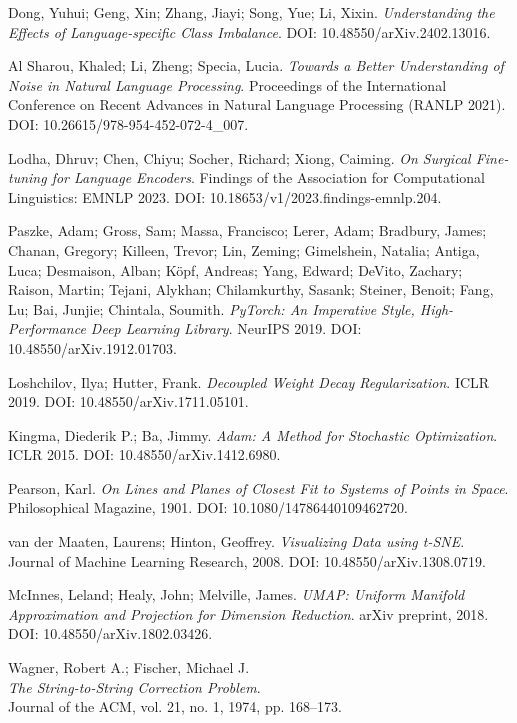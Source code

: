 \documentclass[12pt]{article}
\begin{document}
\begin{thebibliography}{9}
Dong, Yuhui; Geng, Xin; Zhang, Jiayi; Song, Yue; Li, Xixin.
\textit{Understanding the Effects of Language-specific Class Imbalance}.
DOI: 10.48550/arXiv.2402.13016.

Al Sharou, Khaled; Li, Zheng; Specia, Lucia.
\textit{Towards a Better Understanding of Noise in Natural Language Processing}.
Proceedings of the International Conference on Recent Advances in Natural Language Processing (RANLP 2021).
DOI: 10.26615/978-954-452-072-4\_007.

Lodha, Dhruv; Chen, Chiyu; Socher, Richard; Xiong, Caiming.
\textit{On Surgical Fine-tuning for Language Encoders}.
Findings of the Association for Computational Linguistics: EMNLP 2023.
DOI: 10.18653/v1/2023.findings-emnlp.204.

Paszke, Adam; Gross, Sam; Massa, Francisco; Lerer, Adam; Bradbury, James; Chanan, Gregory; Killeen, Trevor; Lin, Zeming; Gimelshein, Natalia; Antiga, Luca; Desmaison, Alban; Köpf, Andreas; Yang, Edward; DeVito, Zachary; Raison, Martin; Tejani, Alykhan; Chilamkurthy, Sasank; Steiner, Benoit; Fang, Lu; Bai, Junjie; Chintala, Soumith.
\textit{PyTorch: An Imperative Style, High-Performance Deep Learning Library}.
NeurIPS 2019.
DOI: 10.48550/arXiv.1912.01703.

Loshchilov, Ilya; Hutter, Frank.
\textit{Decoupled Weight Decay Regularization}.
ICLR 2019.
DOI: 10.48550/arXiv.1711.05101.

Kingma, Diederik P.; Ba, Jimmy.
\textit{Adam: A Method for Stochastic Optimization}.
ICLR 2015.
DOI: 10.48550/arXiv.1412.6980.

Pearson, Karl.
\textit{On Lines and Planes of Closest Fit to Systems of Points in Space}.
Philosophical Magazine, 1901.
DOI: 10.1080/14786440109462720.

van der Maaten, Laurens; Hinton, Geoffrey.
\textit{Visualizing Data using t-SNE}.
Journal of Machine Learning Research, 2008.
DOI: 10.48550/arXiv.1308.0719.

McInnes, Leland; Healy, John; Melville, James.
\textit{UMAP: Uniform Manifold Approximation and Projection for Dimension Reduction}.
arXiv preprint, 2018.
DOI: 10.48550/arXiv.1802.03426.

Wagner, Robert A.; Fischer, Michael J.\\
\textit{The String-to-String Correction Problem}.\\
Journal of the ACM, vol. 21, no. 1, 1974, pp. 168--173.


\end{thebibliography}
\end{document}
